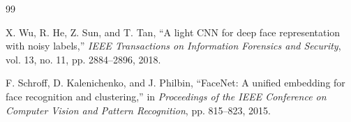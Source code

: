 \documentclass[11pt,a4paper,twocolumn]{article}
\begin{document}
\begin{thebibliography}{99}

%

X. Wu, R. He, Z. Sun, and T. Tan,
``A light CNN for deep face representation with noisy labels,''
\textit{IEEE Transactions on Information Forensics and Security},
vol. 13, no. 11, pp. 2884--2896, 2018.

F. Schroff, D. Kalenichenko, and J. Philbin,
``FaceNet: A unified embedding for face recognition and clustering,''
in \textit{Proceedings of the IEEE Conference on Computer Vision and Pattern Recognition},
pp. 815--823, 2015.

\end{thebibliography}
\end{document}

